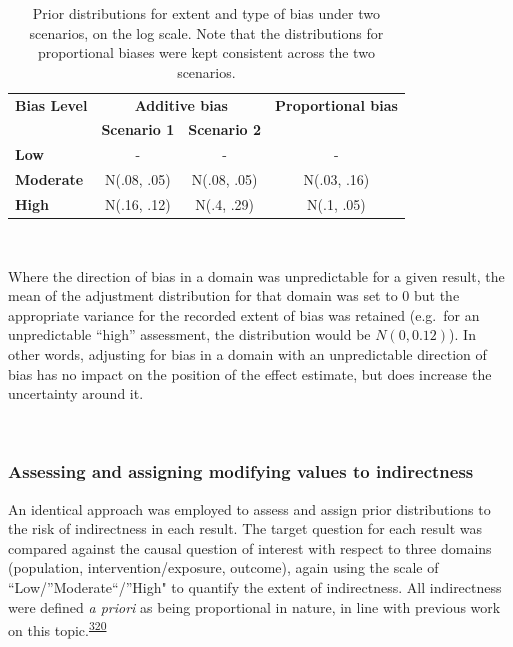 \documentclass[a4paper, twoside]{templates/ociamthesis}
\begin{document}
\begin{table}[H]

\caption[Additive bias distributions]{\label{tab:priorsAdd-table}Prior distributions for extent and type of bias under two scenarios, on the log scale. Note that the distributions for proportional biases were kept consistent across the two scenarios.}
\centering
\begin{tabular}[t]{>{}lccc}
\toprule
\multicolumn{1}{c}{\textbf{Bias Level}} & \multicolumn{2}{c}{\textbf{Additive bias}} & \multicolumn{1}{c}{\textbf{Proportional bias}} \\
\textbf{} & \textbf{Scenario 1} & \textbf{Scenario 2} & \textbf{}\\
\midrule
\textbf{Low} & - & - & -\\
\midrule
\textbf{Moderate} & N(.08, .05) & N(.08, .05) & N(.03, .16)\\
\midrule
\textbf{High} & N(.16, .12) & N(.4, .29) & N(.1, .05)\\
\bottomrule
\end{tabular}
\end{table}

~

Where the direction of bias in a domain was unpredictable for a given result, the mean of the adjustment distribution for that domain was set to 0 but the appropriate variance for the recorded extent of bias was retained (e.g.~for an unpredictable ``high'' assessment, the distribution would be \(N(0,0.12)\)). In other words, adjusting for bias in a domain with an unpredictable direction of bias has no impact on the position of the effect estimate, but does increase the uncertainty around it.

~

\hypertarget{assessing-and-assigning-modifying-values-to-indirectness}{%
\subsubsection{Assessing and assigning modifying values to indirectness}\label{assessing-and-assigning-modifying-values-to-indirectness}}

An identical approach was employed to assess and assign prior distributions to the risk of indirectness in each result. The target question for each result was compared against the causal question of interest with respect to three domains (population, intervention/exposure, outcome), again using the scale of ``Low/''Moderate``/''High" to quantify the extent of indirectness. All indirectness were defined \emph{a priori} as being proportional in nature, in line with previous work on this topic.\textsuperscript{\protect\hyperlink{ref-turner2009}{320}}
\end{document}
